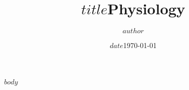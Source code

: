 \documentclass[twocolumn]{article}
\author{$author$}
\author{}
\title{$title$}
\title{Physiology}
\date{$date$}
\date{\today}
\begin{document}
\maketitle

$body$

\newpage
\onecolumn

\printbibliography
\end{document}
